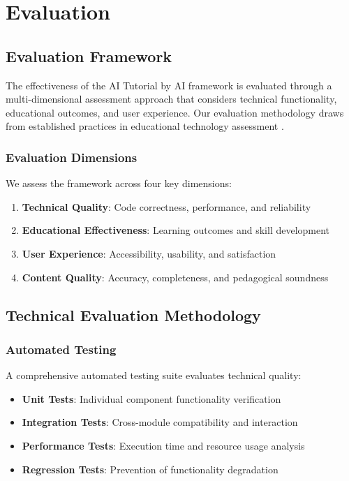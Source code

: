 \section{Evaluation}
\label{sec:evaluation}

\subsection{Evaluation Framework}

The effectiveness of the AI Tutorial by AI framework is evaluated through a multi-dimensional assessment approach that considers technical functionality, educational outcomes, and user experience. Our evaluation methodology draws from established practices in educational technology assessment \cite{kirkpatrick1994evaluating}.

\subsubsection{Evaluation Dimensions}

We assess the framework across four key dimensions:

\begin{enumerate}
    \item \textbf{Technical Quality}: Code correctness, performance, and reliability
    \item \textbf{Educational Effectiveness}: Learning outcomes and skill development
    \item \textbf{User Experience}: Accessibility, usability, and satisfaction
    \item \textbf{Content Quality}: Accuracy, completeness, and pedagogical soundness
\end{enumerate}

\subsection{Technical Evaluation Methodology}

\subsubsection{Automated Testing}

A comprehensive automated testing suite evaluates technical quality:

\begin{itemize}
    \item \textbf{Unit Tests}: Individual component functionality verification
    \item \textbf{Integration Tests}: Cross-module compatibility and interaction
    \item \textbf{Performance Tests}: Execution time and resource usage analysis
    \item \textbf{Regression Tests}: Prevention of functionality degradation
\end{itemize}

